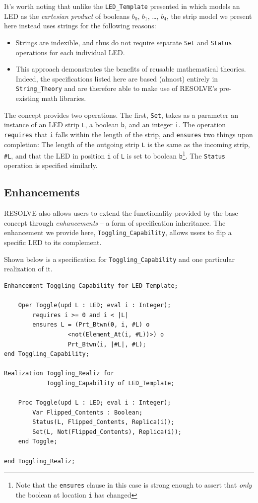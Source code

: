 It's worth noting that unlike the \texttt{LED\_Template} presented in \cite{regula:2010} which models an LED as the \textit{cartesian product} of booleans $b_0$, $b_1$, \ldots , $b_4$, the strip model we present here instead uses strings for the following reasons:
\begin{itemize}
\item Strings are indexible, and thus do not require separate \texttt{Set} and \texttt{Status} operations for each individual LED.
\item This approach demonstrates the benefits of reusable mathematical theories. Indeed, the specifications listed here are based (almost) entirely in \texttt{String\_Theory} and are therefore able to make use of RESOLVE's pre-existing math libraries.
\end{itemize}

The concept provides two operations. The first, \texttt{Set}, takes as a parameter an instance of an LED strip \texttt{L}, a boolean \texttt{b}, and an integer \texttt{i}. The operation \texttt{requires} that \texttt{i} falls within the length of the strip, and \texttt{ensures} two things upon completion: The length of the outgoing strip \texttt{L} is the same as the incoming strip, \texttt{\#L}, and that the LED in position \texttt{i} of \texttt{L} is set to boolean \texttt{b}\footnote{Note that the \texttt{ensures} clause in this case is strong enough to assert that \textit{only} the boolean at location \texttt{i} has changed}. The \texttt{Status} operation is specified similarly. 

\subsection{Enhancements}

RESOLVE also allows users to extend the functionality provided by the base concept through \textit{enhancements} -- a form of specification inheritance. The enhancement we provide here, \texttt{Toggling\_Capability}, allows users to flip a specific LED to its complement.

Shown below is a specification for \texttt{Toggling\_Capability} and one particular realization of it.

\begin{verbatim}
Enhancement Toggling_Capability for LED_Template;

    Oper Toggle(upd L : LED; eval i : Integer);
        requires i >= 0 and i < |L|
        ensures L = (Prt_Btwn(0, i, #L) o  
                  <not(Element_At(i, #L))>) o
                  Prt_Btwn(i, |#L|, #L);
end Toggling_Capability;

Realization Toggling_Realiz for
            Toggling_Capability of LED_Template;

    Proc Toggle(upd L : LED; eval i : Integer);
        Var Flipped_Contents : Boolean;
        Status(L, Flipped_Contents, Replica(i));
        Set(L, Not(Flipped_Contents), Replica(i));
    end Toggle;
    
end Toggling_Realiz;
\end{verbatim}

